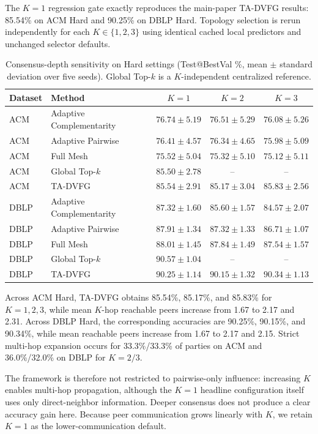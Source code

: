 \documentclass[letterpaper]{article}
\newcommand{\method}{\textsc{TA-DVFG}}
\begin{document}
The $K=1$ regression gate exactly reproduces the main-paper \method{} results:
85.54\% on ACM Hard and 90.25\% on DBLP Hard. Topology selection is rerun
independently for each $K\in\{1,2,3\}$ using identical cached local predictors
and unchanged selector defaults.

\begin{table}[!t]
\centering
\scriptsize
\setlength{\tabcolsep}{4.0pt}
\caption{Consensus-depth sensitivity on Hard settings
(Test@BestVal \%, mean $\pm$ standard deviation over five seeds).
Global Top-$k$ is a $K$-independent centralized reference.}
\label{tab:supp-k-sensitivity}
\begin{tabular}{llccc}
\toprule
Dataset & Method & $K=1$ & $K=2$ & $K=3$ \\
\midrule
ACM & Adaptive Complementarity & $76.74\pm5.19$ & $76.51\pm5.29$ & $76.08\pm5.26$ \\
ACM & Adaptive Pairwise & $76.41\pm4.57$ & $76.34\pm4.65$ & $75.98\pm5.09$ \\
ACM & Full Mesh & $75.52\pm5.04$ & $75.32\pm5.10$ & $75.12\pm5.11$ \\
ACM & Global Top-$k$ & $85.50\pm2.78$ & -- & -- \\
ACM & \method{} & $85.54\pm2.91$ & $85.17\pm3.04$ & $85.83\pm2.56$ \\
\midrule
DBLP & Adaptive Complementarity & $87.32\pm1.60$ & $85.60\pm1.57$ & $84.57\pm2.07$ \\
DBLP & Adaptive Pairwise & $87.91\pm1.34$ & $87.32\pm1.33$ & $86.71\pm1.07$ \\
DBLP & Full Mesh & $88.01\pm1.45$ & $87.84\pm1.49$ & $87.54\pm1.57$ \\
DBLP & Global Top-$k$ & $90.57\pm1.04$ & -- & -- \\
DBLP & \method{} & $90.25\pm1.14$ & $90.15\pm1.32$ & $90.34\pm1.13$ \\
\bottomrule
\end{tabular}
\end{table}

Across ACM Hard, \method{} obtains 85.54\%, 85.17\%, and 85.83\% for
$K=1,2,3$, while mean $K$-hop reachable peers increase from 1.67 to 2.17 and
2.31. Across DBLP Hard, the corresponding accuracies are 90.25\%, 90.15\%,
and 90.34\%, while mean reachable peers increase from 1.67 to 2.17 and 2.15.
Strict multi-hop expansion occurs for 33.3\%/33.3\% of parties on ACM and
36.0\%/32.0\% on DBLP for $K=2/3$.

The framework is therefore not restricted to pairwise-only influence:
increasing $K$ enables multi-hop propagation, although the $K=1$ headline
configuration itself uses only direct-neighbor information. Deeper consensus
does not produce a clear accuracy gain here. Because peer communication grows
linearly with $K$, we retain $K=1$ as the lower-communication default.
\end{document}
